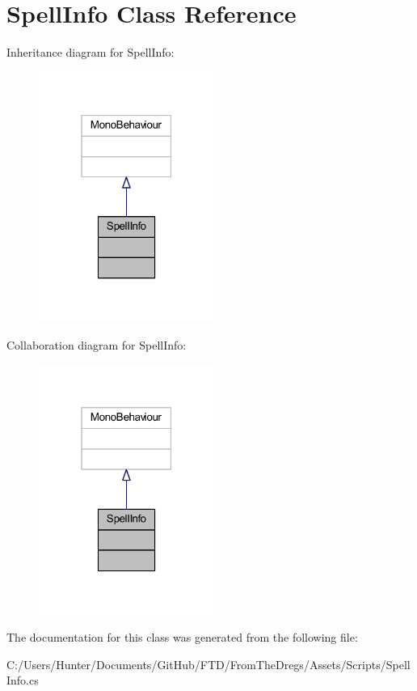 \hypertarget{class_spell_info}{}\section{Spell\+Info Class Reference}
\label{class_spell_info}


Inheritance diagram for Spell\+Info\+:
\nopagebreak
\begin{figure}[H]
\begin{center}
\leavevmode
\includegraphics[width=163pt]{class_spell_info__inherit__graph}
\end{center}
\end{figure}


Collaboration diagram for Spell\+Info\+:
\nopagebreak
\begin{figure}[H]
\begin{center}
\leavevmode
\includegraphics[width=163pt]{class_spell_info__coll__graph}
\end{center}
\end{figure}


The documentation for this class was generated from the following file\+:\begin{DoxyCompactItemize}
\item 
C\+:/\+Users/\+Hunter/\+Documents/\+Git\+Hub/\+F\+T\+D/\+From\+The\+Dregs/\+Assets/\+Scripts/Spell\+Info.\+cs\end{DoxyCompactItemize}
